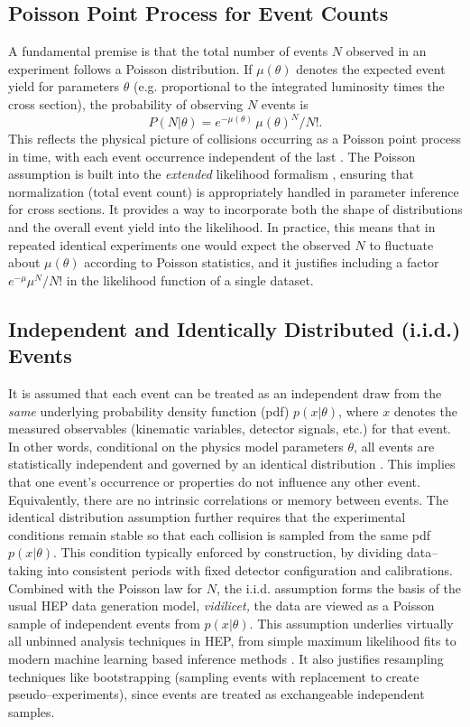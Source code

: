     \subsection{Poisson Point Process for Event Counts}
        A fundamental premise is that the total number of events $N$ observed in an experiment follows a Poisson distribution.
        If $\mu(\theta)$ denotes the expected event yield for parameters $\theta$ (e.g. proportional to the integrated luminosity times the cross section), the probability of observing $N$ events is
        \[P(N|\theta) = e^{-\mu(\theta)}\,\mu(\theta)^N/N!.\]
        This reflects the physical picture of collisions occurring as a Poisson point process in time, with each event occurrence independent of the last .
        The Poisson assumption is built into the \emph{extended} likelihood formalism , ensuring that normalization (total event count) is appropriately handled in parameter inference for cross sections.
        It provides a way to incorporate both the shape of distributions and the overall event yield into the likelihood.
        In practice, this means that in repeated identical experiments one would expect the observed $N$ to fluctuate about $\mu(\theta)$ according to Poisson statistics, and it justifies including a factor $e^{-\mu}\mu^N/N!$ in the likelihood function of a single dataset.
        
    \subsection{Independent and Identically Distributed (i.i.d.) Events}
        It is assumed that each event can be treated as an independent draw from the \emph{same} underlying probability density function (pdf) $p(x|\theta)$, where $x$ denotes the measured observables (kinematic variables, detector signals, etc.) for that event.
        In other words, conditional on the physics model parameters $\theta$, all events are statistically independent and governed by an identical distribution .
        This implies that one event’s occurrence or properties do not influence any other event.
        Equivalently, there are no intrinsic correlations or memory between events.
        The identical distribution assumption further requires that the experimental conditions remain stable so that each collision is sampled from the same pdf $p(x|\theta)$.
        This condition typically enforced by construction, by dividing data--taking into consistent periods with fixed detector configuration and calibrations.
        Combined with the Poisson law for $N$, the i.i.d. assumption forms the basis of the usual HEP data generation model, \textit{vidilicet,}
        the data are viewed as a Poisson sample of independent events from $p(x|\theta)$.
        This assumption underlies virtually all unbinned analysis techniques in HEP, from simple maximum likelihood fits to modern machine learning based inference methods .
        It also justifies resampling techniques like bootstrapping (sampling events with replacement to create pseudo--experiments), since events are treated as exchangeable independent samples.
